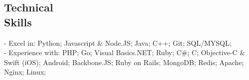 \documentclass[margin]{res}
\begin{document}
\begin{resume}
\section{Technical \\ Skills}
- Excel in: Python; Javascript \& Node.JS; Java;  C++; Git; SQL/MYSQL; \\
- Experience with: PHP; Go; Visual Basics.NET; Ruby; C\#; C; Objective-C \& Swift (iOS); Android; Backbone.JS; Ruby on Rails; MongoDB; Redis; Apache; Nginx; Linux;

\end{resume} 
\end{document}

